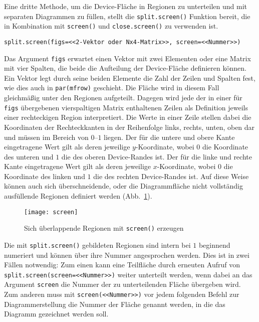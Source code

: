 Eine dritte Methode, um die Device-Fläche in Regionen zu unterteilen und mit separaten Diagrammen zu füllen, stellt die \lstinline!split.screen()! Funktion bereit, die in Kombination mit \lstinline!screen()! und \lstinline!close.screen()! zu verwenden ist.
\begin{lstlisting}
split.screen(figs=<<2-Vektor oder Nx4-Matrix>>, screen=<<Nummer>>)
\end{lstlisting}

Das Argument \lstinline!figs! erwartet einen Vektor mit zwei Elementen oder eine Matrix mit vier Spalten, die beide die Aufteilung der Device-Fläche definieren können. Ein Vektor legt durch seine beiden Elemente die Zahl der Zeilen und Spalten fest, wie dies auch in \lstinline!par(mfrow)! geschieht. Die Fläche wird in diesem Fall gleichmäßig unter den Regionen aufgeteilt. Dagegen wird jede der in einer für \lstinline!figs! übergebenen vierspaltigen Matrix enthaltenen Zeilen als Definition jeweils einer rechteckigen Region interpretiert. Die Werte in einer Zeile stellen dabei die Koordinaten der Rechteckkanten in der Reihenfolge links, rechts, unten, oben dar und müssen im Bereich von $0$--$1$ liegen. Der für die untere und obere Kante eingetragene Wert gilt als deren jeweilige $y$-Koordinate, wobei $0$ die Koordinate des unteren und $1$ die des oberen Device-Randes ist. Der für die linke und rechte Kante eingetragene Wert gilt als deren jeweilige $x$-Koordinate, wobei $0$ die Koordinate des linken und $1$ die des rechten Device-Randes ist. Auf diese Weise können auch sich überschneidende, oder die Diagrammfläche nicht vollständig ausfüllende Regionen definiert werden (Abb.\ \ref{fig:screen}).

\begin{figure}[ht]
\centering
\texttt{[image: screen]}
\vspace*{-1em}
\caption{Sich überlappende Regionen mit \lstinline!screen()! erzeugen}
\label{fig:screen}
\end{figure}

Die mit \lstinline!split.screen()! gebildeten Regionen sind intern bei $1$ beginnend numeriert und können über ihre Nummer angesprochen werden. Dies ist in zwei Fällen notwendig: Zum einen kann eine Teilfläche durch erneuten Aufruf von \lstinline!split.screen(screen=<<Nummer>>)! weiter unterteilt werden, wenn dabei an das Argument \lstinline!screen! die Nummer der zu unterteilenden Fläche übergeben wird. Zum anderen muss mit \lstinline!screen(<<Nummer>>)! vor jedem folgenden Befehl zur Diagrammerstellung die Nummer der Fläche genannt werden, in die das Diagramm gezeichnet werden soll.

